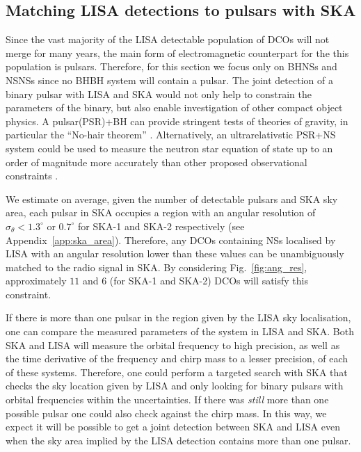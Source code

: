 \subsection{Matching LISA detections to pulsars with SKA}\label{sec:pulsar_matching}
Since the vast majority of the LISA detectable population of DCOs will not merge for many years, the main form of electromagnetic counterpart for the this population is pulsars. Therefore, for this section we focus only on BHNSs and NSNSs since no BHBH system will contain a pulsar. The joint detection of a binary pulsar with LISA and SKA would not only help to constrain the parameters of the binary, but also enable investigation of other compact object physics. A pulsar(PSR)+BH can provide stringent tests of theories of gravity, in particular the ``No-hair theorem'' \citep{Keane+2015}. Alternatively, an ultrarelativstic PSR+NS system could be used to measure the neutron star equation of state up to an order of magnitude more accurately than other proposed observational constraints \citep{Kyutoku+2019, Thrane+2020}.

We estimate on average, given the number of detectable pulsars and SKA sky area, each pulsar in SKA occupies a region with an angular resolution of $\sigma_{\theta} < 1.3^\circ$ or $0.7^\circ$ for SKA-1 and SKA-2 respectively (see Appendix~\ref{app:ska_area}). Therefore, any DCOs containing NSs localised by LISA with an angular resolution lower than these values can be unambiguously matched to the radio signal in SKA. By considering Fig.~\ref{fig:ang_res}, approximately $11$ and $6$ (for SKA-1 and SKA-2) DCOs will satisfy this constraint.

If there is more than one pulsar in the region given by the LISA sky localisation, one can compare the measured parameters of the system in LISA and SKA. Both SKA and LISA will measure the orbital frequency to high precision, as well as the time derivative of the frequency and chirp mass to a lesser precision, of each of these systems. Therefore, one could perform a targeted search with SKA that checks the sky location given by LISA and only looking for binary pulsars with orbital frequencies within the uncertainties. If there was \textit{still} more than one possible pulsar one could also check against the chirp mass. In this way, we expect it will be possible to get a joint detection between SKA and LISA even when the sky area implied by the LISA detection contains more than one pulsar.

